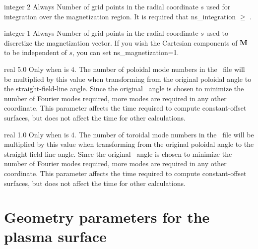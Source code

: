 \myhrule

{integer}
{2}
{Always}
{
Number of grid points in the radial coordinate $s$ used for integration over the magnetization region.
It is required that {\ttfamily ns\_integration} $\ge$ .
}

\myhrule

{integer}
{1}
{Always}
{
Number of grid points in the radial coordinate $s$ used to discretize the magnetization vector. If you wish the Cartesian components of ${\mathbf M}$ to be
independent of $s$, you can set {\ttfamily ns\_magnetization=1}.
}

\myhrule

{real}
{5.0}
{Only when  is 4.}
{The number of poloidal mode numbers in the \vmec~file will be multiplied by this value
when transforming from the original poloidal angle to the straight-field-line angle.
Since the original \vmec~angle is chosen to minimize the number of Fourier modes required,
more modes are required in any other coordinate.
This parameter affects the time required to compute constant-offset surfaces,
but does not affect the time for other calculations.
}

\myhrule

{real}
{1.0}
{Only when  is 4.}
{The number of toroidal mode numbers in the \vmec~file will be multiplied by this value
when transforming from the original poloidal angle to the straight-field-line angle.
Since the original \vmec~angle is chosen to minimize the number of Fourier modes required,
more modes are required in any other coordinate.
This parameter affects the time required to compute constant-offset surfaces,
but does not affect the time for other calculations.
}

\myhrule

\section{Geometry parameters for the plasma surface}

